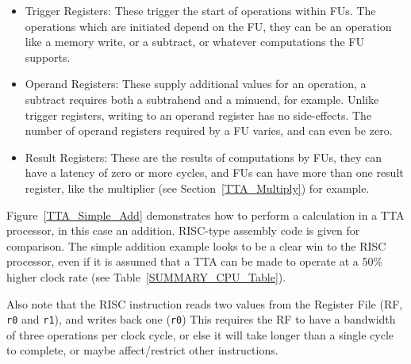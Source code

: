 \begin{itemize}
  \item Trigger Registers: These trigger the start of operations within FUs.
  The operations which are initiated depend on the FU, they can be an
  operation like a memory write, or a subtract, or whatever computations the FU
  supports.
  \item Operand Registers: These supply additional values for an operation, a
  subtract requires both a subtrahend and a minuend, for example. Unlike
  trigger registers, writing to an operand register has no side-effects. The
  number of operand registers required by a FU varies, and can even be zero.
  \item Result Registers: These are the results of computations by FUs, they
  can have a latency of zero or more cycles, and FUs can have more than one
  result register, like the multiplier (see Section~\ref{TTA_Multiply}) for
  example.
\end{itemize}

Figure~\ref{TTA_Simple_Add} demonstrates how to perform a calculation in a TTA
processor, in this case an addition. RISC-type assembly code is given for
comparison. The simple addition example looks to be a clear win to the RISC
processor, even if it is assumed that a TTA can be made to operate at a 50\%
higher clock rate (see Table~\ref{SUMMARY_CPU_Table}).

Also note that the RISC instruction reads two values from the Register
File (RF, \texttt{r0} and
\texttt{r1}), and writes back one (\texttt{r0}) This requires the RF to have a
bandwidth of three operations per clock cycle, or else it will take longer than a
single cycle to complete, or maybe affect/restrict other instructions.

